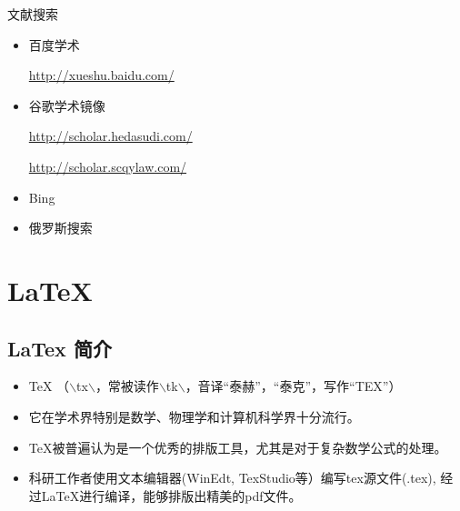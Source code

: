 \documentclass[13pt]{ctexbeamer}
\begin{document}
\begin{frame}{文献搜索}
    \begin{itemize}
        \item
        百度学术

        \href{http://xueshu.baidu.com/}{http://xueshu.baidu.com/}




        \item
        谷歌学术镜像

        \href{http://scholar.hedasudi.com/}{http://scholar.hedasudi.com/}

        \href{http://scholar.scqylaw.com/}{http://scholar.scqylaw.com/}

        \item
        Bing

        \item 俄罗斯搜索
    \end{itemize}

\end{frame}


\section{LaTeX}

\subsection{LaTex 简介}
\begin{frame}
	\begin{itemize}
	\item 	TeX
（$\backslash$t\textepsilon x$\backslash$，常被读作$\backslash$t\textepsilon k$\backslash$，音译“泰赫”，“泰克”，写作“TEX”）

\item 它在学术界特别是数学、物理学和计算机科学界十分流行。
	\item
TeX被普遍认为是一个优秀的排版工具，尤其是对于复杂数学公式的处理。
	\item
科研工作者使用文本编辑器(WinEdt, TexStudio等）编写tex源文件(.tex),  经过LaTeX进行编译，能够排版出精美的pdf文件。
\end{itemize}

\begin{figure}

\end{figure}

\end{frame}
\end{document}
